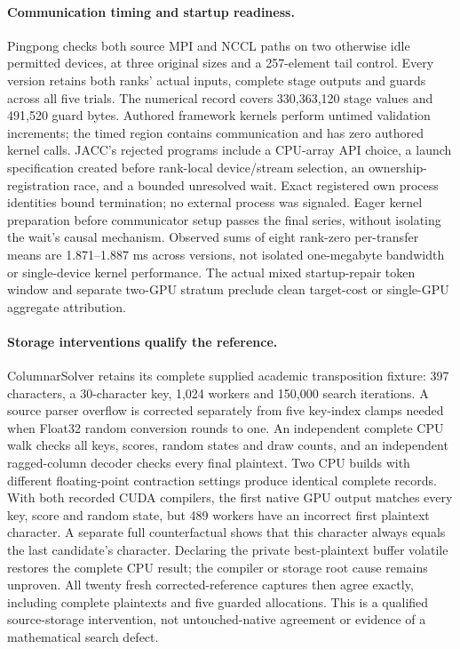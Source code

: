 \paragraph{Communication timing and startup readiness.}
Pingpong checks both source MPI and NCCL paths on two otherwise idle permitted devices, at three original sizes and a 257-element tail control. Every version retains both ranks' actual inputs, complete stage outputs and guards across all five trials. The numerical record covers 330,363,120 stage values and 491,520 guard bytes. Authored framework kernels perform untimed validation increments; the timed region contains communication and has zero authored kernel calls. JACC's rejected programs include a CPU-array API choice, a launch specification created before rank-local device/stream selection, an ownership-registration race, and a bounded unresolved wait. Exact registered own process identities bound termination; no external process was signaled. Eager kernel preparation before communicator setup passes the final series, without isolating the wait's causal mechanism. Observed sums of eight rank-zero per-transfer means are 1.871--1.887 ms across versions, not isolated one-megabyte bandwidth or single-device kernel performance. The actual mixed startup-repair token window and separate two-GPU stratum preclude clean target-cost or single-GPU aggregate attribution.

\paragraph{Storage interventions qualify the reference.}
ColumnarSolver retains its complete supplied academic transposition fixture: 397 characters, a 30-character key, 1,024 workers and 150,000 search iterations. A source parser overflow is corrected separately from five key-index clamps needed when Float32 random conversion rounds to one. An independent complete CPU walk checks all keys, scores, random states and draw counts, and an independent ragged-column decoder checks every final plaintext. Two CPU builds with different floating-point contraction settings produce identical complete records. With both recorded CUDA compilers, the first native GPU output matches every key, score and random state, but 489 workers have an incorrect first plaintext character. A separate full counterfactual shows that this character always equals the last candidate's character. Declaring the private best-plaintext buffer volatile restores the complete CPU result; the compiler or storage root cause remains unproven. All twenty fresh corrected-reference captures then agree exactly, including complete plaintexts and five guarded allocations. This is a qualified source-storage intervention, not untouched-native agreement or evidence of a mathematical search defect.

